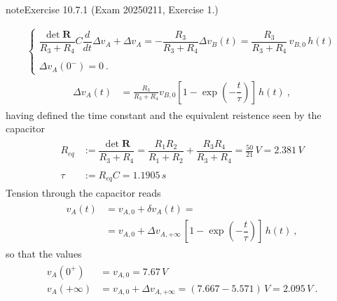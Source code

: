 \documentclass[letterpaper,10pt,italian]{jupyterBook}
\begin{document}
\begin{sphinxadmonition}{note}{Exercise 10.7.1 (Exam 2025\sphinxhyphen{}02\sphinxhyphen{}11, Exercise 1.)}
\begin{itemize}
\begin{equation*}
\begin{split}
\begin{cases}
     \dfrac{\det \mathbf{R}}{R_3 + R_4} C  \dfrac{d}{dt}\Delta v_A + \Delta v_{A} = - \dfrac{R_3}{R_3 + R_4} \Delta v_{B}(t) = \dfrac{R_3}{R_3 + R_4} \, v_{B,0} \, h(t) \\ \\
     \Delta v_A(0^-) = 0 \ .
   \end{cases}\end{split}
\end{equation*}\begin{equation*}
\begin{split}\begin{aligned}
     \Delta v_A(t)
     & = \frac{R_3}{R_3 + R_4} v_{B,0} \left[ 1 - \exp\left( - \dfrac{t}{\tau} \right) \right] \, h(t) \ ,
   \end{aligned}\end{split}
\end{equation*}
\sphinxAtStartPar
having defined the time constant and the equivalent reistence seen by the capacitor
\begin{equation*}
\begin{split}\begin{aligned}
     R_{eq} & := \dfrac{\det \mathbf{R}}{R_3+R_4} = \dfrac{R_1 R_2}{R_1 + R_2} + \dfrac{R_3 R_4}{R_3 + R_4} = \frac{50}{21} \, V = 2.381 \, V  \\ \\
     \tau   & := R_{eq} C = 1.1905 \, s 
   \end{aligned}\end{split}
\end{equation*}
\sphinxAtStartPar
Tension through the capacitor reads
\begin{equation*}
\begin{split}\begin{aligned}
     v_A(t) 
     & = v_{A,0} + \delta v_A(t) = \\
     & = v_{A,0} + \Delta v_{A,+\infty} \, \left[ 1 - \exp\left( - \dfrac{t}{\tau} \right) \right] \, h(t) \ , 
   \end{aligned}\end{split}
\end{equation*}
\sphinxAtStartPar
so that the values
\begin{equation*}
\begin{split}\begin{aligned} 
     v_A(0^+)     & = v_{A,0} = 7.67 \, V \\
     v_A(+\infty) & = v_{A,0} + \Delta v_{A,+\infty} = ( 7.667 - 5.571 ) \, V = 2.095 \, V \ .
   \end{aligned}\end{split}

\end{equation*}
\end{itemize}
\end{sphinxadmonition}
\end{document}
